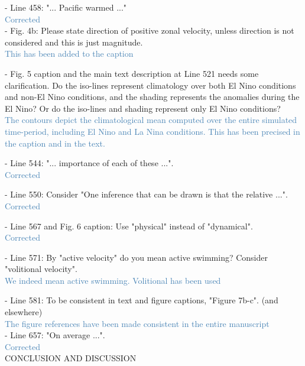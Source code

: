 \documentclass[12pt]{article}
\newcommand{\resp}[1]{\textcolor{SteelBlue}{#1}}
\begin{document}
- Line 458: "... Pacific warmed ..."\\

\resp{Corrected} \\

- Fig. 4b: Please state direction of positive zonal velocity, unless direction is not considered and this is just magnitude.\\

\resp{This has been added to the caption}

- Fig. 5 caption and the main text description at Line 521 needs some clarification. Do the iso-lines represent climatology over both El Nino conditions and non-El Nino conditions, and the shading represents the anomalies during the El Nino? Or do the iso-lines and shading represent only El Nino conditions?\\

\resp{The contours depict the climatological mean computed over the entire simulated time-period,  including El Nino and La Nina conditions. This has been precised in the caption and in the text.}

- Line 544: "... importance of each of these ...".\\

\resp{Corrected}

- Line 550: Consider "One inference that can be drawn is that the relative ...".\\

\resp{Corrected}

- Line 567 and Fig. 6 caption: Use "physical" instead of "dynamical".\\

\resp{Corrected}

- Line 571: By "active velocity" do you mean active swimming? Consider "volitional velocity".\\

\resp{We indeed mean active swimming. Volitional has been used}

- Line 581: To be consistent in text and figure captions, "Figure 7b-c". (and elsewhere)\\

\resp{The figure references have been made consistent in the entire manuscript} \\

- Line 657: "On average ...".\\

\resp{Corrected} \\

CONCLUSION AND DISCUSSION\\
\end{document}
